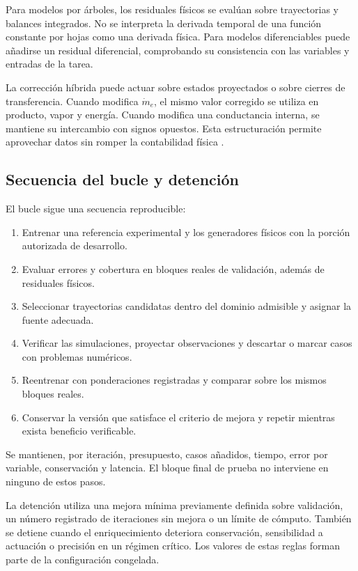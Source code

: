 Para modelos por árboles, los residuales físicos se evalúan sobre trayectorias y balances integrados. No se interpreta la derivada temporal de una función constante por hojas como una derivada física. Para modelos diferenciables puede añadirse un residual diferencial, comprobando su consistencia con las variables y entradas de la tarea.

La corrección híbrida puede actuar sobre estados proyectados o sobre cierres de transferencia. Cuando modifica $\dot m_e$, el mismo valor corregido se utiliza en producto, vapor y energía. Cuando modifica una conductancia interna, se mantiene su intercambio con signos opuestos. Esta estructuración permite aprovechar datos sin romper la contabilidad física \cite{psichogios1992}.

\subsection{Secuencia del bucle y detención}

El bucle sigue una secuencia reproducible:
\begin{enumerate}
\item Entrenar una referencia experimental y los generadores físicos con la porción autorizada de desarrollo.
\item Evaluar errores y cobertura en bloques reales de validación, además de residuales físicos.
\item Seleccionar trayectorias candidatas dentro del dominio admisible y asignar la fuente adecuada.
\item Verificar las simulaciones, proyectar observaciones y descartar o marcar casos con problemas numéricos.
\item Reentrenar con ponderaciones registradas y comparar sobre los mismos bloques reales.
\item Conservar la versión que satisface el criterio de mejora y repetir mientras exista beneficio verificable.
\end{enumerate}
Se mantienen, por iteración, presupuesto, casos añadidos, tiempo, error por variable, conservación y latencia. El bloque final de prueba no interviene en ninguno de estos pasos.

La detención utiliza una mejora mínima previamente definida sobre validación, un número registrado de iteraciones sin mejora o un límite de cómputo. También se detiene cuando el enriquecimiento deteriora conservación, sensibilidad a actuación o precisión en un régimen crítico. Los valores de estas reglas forman parte de la configuración congelada.

